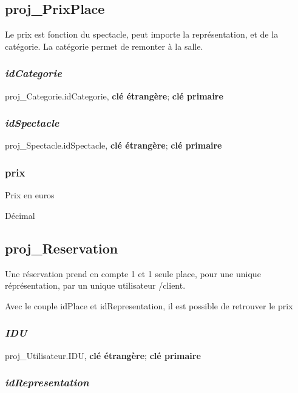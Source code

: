 \subsection{proj\_PrixPlace}\label{projux5fprixplace}

Le prix est fonction du spectacle, peut importe la représentation, et de
la catégorie. La catégorie permet de remonter à la salle.

\subsubsection{\texorpdfstring{\textbf{\emph{idCategorie}}}{idCategorie}}\label{idcategorie-2}

proj\_Categorie.idCategorie, \textbf{clé étrangère}; \textbf{clé
primaire}

\subsubsection{\texorpdfstring{\textbf{\emph{idSpectacle}}}{idSpectacle}}\label{idspectacle-2}

proj\_Spectacle.idSpectacle, \textbf{clé étrangère}; \textbf{clé
primaire}

\subsubsection{prix}\label{prix}

Prix en euros

Décimal

\subsection{proj\_Reservation}\label{projux5freservation}

Une réservation prend en compte 1 et 1 seule place, pour une unique
réprésentation, par un unique utilisateur /client.

Avec le couple idPlace et idRepresentation, il est possible de retrouver
le prix

\subsubsection{\texorpdfstring{\textbf{\emph{IDU}}}{IDU}}\label{idu-1}

proj\_Utilisateur.IDU, \textbf{clé étrangère}; \textbf{clé primaire}

\subsubsection{\texorpdfstring{\textbf{\emph{idRepresentation}}}{idRepresentation}}\label{idrepresentation-1}

